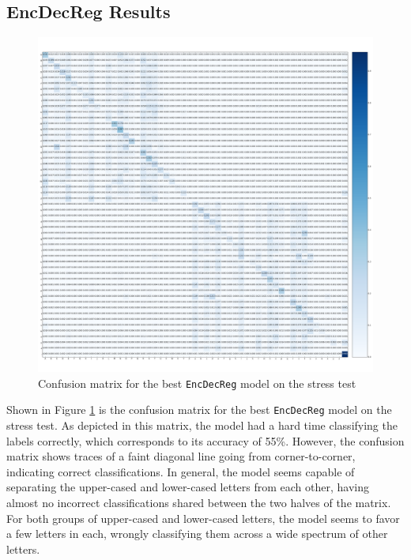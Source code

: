 \newpage
\subsection{EncDecReg Results}
\begin{figure}[ht]
    \centering
    \includegraphics[width=1\textwidth]{fig/results/experiment4/encdecreg/confusion_matrix.png}
    \caption{Confusion matrix for the best {\tt EncDecReg} model on the stress test}
    \label{fig:result4_encdecreg_confusion_matrix}
\end{figure}

Shown in Figure \ref{fig:result4_encdecreg_confusion_matrix} is the confusion matrix for the best {\tt EncDecReg} model on the stress test. As depicted in this matrix, the model had a hard time classifying the labels correctly, which corresponds to its accuracy of 55\%. However, the confusion matrix shows traces of a faint diagonal line going from corner-to-corner, indicating correct classifications. In general, the model seems capable of separating the upper-cased and lower-cased letters from each other, having almost no incorrect classifications shared between the two halves of the matrix. For both groups of upper-cased and lower-cased letters, the model seems to favor a few letters in each, wrongly classifying them across a wide spectrum of other letters.

